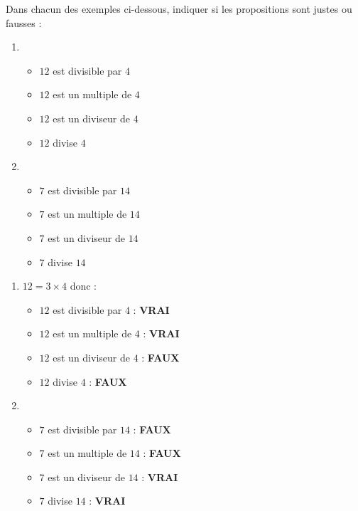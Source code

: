 
Dans chacun des exemples ci-dessous, indiquer si les propositions sont justes ou fausses :
\begin{enumerate}
     \item
     \begin{itemize}
          \item
          $12$ est divisible par $4$
          \item
          $12$ est un multiple de $4$
          \item
          $12$ est un diviseur de $4$
          \item
          $12$ divise $4$
     \end{itemize}
     \item
     \begin{itemize}
          \item
          $7$ est divisible par $14$
          \item
          $7$ est un multiple de $14$
          \item
          $7$ est un diviseur de $14$
          \item
          $7$ divise $14$
     \end{itemize}
\end{enumerate}
\begin{corrige}
     \begin{enumerate}
          \item
          $12=3\times 4$ donc :
          \begin{itemize}
               \item
               $12$ est divisible par $4$ : \textbf{VRAI}
               \item
               $12$ est un multiple de $4$ : \textbf{VRAI}
               \item
               $12$ est un diviseur de $4$ : \textbf{FAUX}
               \item
               $12$ divise $4$ : \textbf{FAUX}
          \end{itemize}
          \item
          \begin{itemize}
               \item
               $7$ est divisible par $14$ : \textbf{FAUX}
               \item
               $7$ est un multiple de $14$ : \textbf{FAUX}
               \item
               $7$ est un diviseur de $14$ : \textbf{VRAI}
               \item
               $7$ divise $14$ : \textbf{VRAI}
          \end{itemize}
     \end{enumerate}
\end{corrige}
